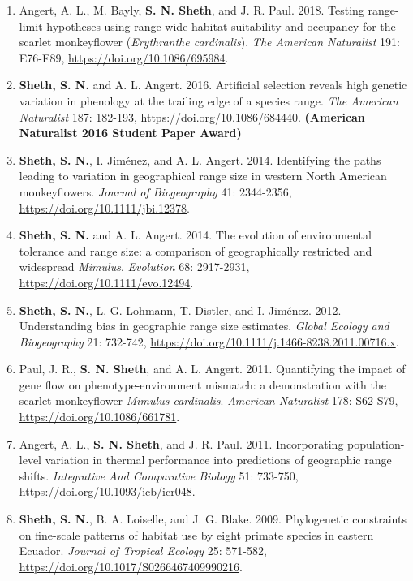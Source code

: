 \documentclass[11pt,english]{article}
\begin{document}
\begin{hangparas}{.5in}{1}
\begin{enumerate}
\item Angert, A. L., M. Bayly, \textbf{S. N. Sheth}, and J. R. Paul. 2018. Testing range-limit hypotheses using range-wide habitat suitability and occupancy for the scarlet monkeyflower (\textit{Erythranthe cardinalis}). \emph{The American Naturalist} 191: E76-E89, \url{https://doi.org/10.1086/695984}.

 \item \textbf{Sheth, S. N.} and A. L. Angert. 2016. Artificial selection reveals high genetic variation in phenology at the trailing edge of a species range. \emph{The American Naturalist} 187: 182-193, \url{https://doi.org/10.1086/684440}. \textbf{(American Naturalist 2016 Student Paper Award)} 
 
\item \textbf{Sheth, S. N.}, I. Jim\'enez, and A. L. Angert. 2014. Identifying the paths leading to variation in geographical range size in western North American monkeyflowers. \emph{Journal of Biogeography} 41: 2344-2356, \url{https://doi.org/10.1111/jbi.12378}. 

\item \textbf{Sheth, S. N.} and A. L. Angert. 2014. The evolution of environmental tolerance and range size: a comparison of geographically restricted and widespread \textit{Mimulus}. \emph{Evolution} 68: 2917-2931, \url{https://doi.org/10.1111/evo.12494}. 

\item \textbf{Sheth, S. N.}, L. G. Lohmann, T. Distler, and I. Jim\'enez. 2012. Understanding bias in geographic range size estimates. \emph{Global Ecology and Biogeography} 21: 732-742, \url{https://doi.org/10.1111/j.1466-8238.2011.00716.x}.
 
 \item Paul, J. R., \textbf{S. N. Sheth}, and A. L. Angert. 2011. Quantifying the impact of gene flow on phenotype-environment mismatch: a demonstration with the scarlet monkeyflower \textit{Mimulus cardinalis}. \emph{American Naturalist} 178: S62-S79, \url{https://doi.org/10.1086/661781}. 
 
\item Angert, A. L., \textbf{S. N. Sheth}, and J. R. Paul. 2011. Incorporating population-level variation in thermal performance into predictions of geographic range shifts. \emph{Integrative And Comparative Biology} 51: 733-750, \url{https://doi.org/10.1093/icb/icr048}. 

\item \textbf{Sheth, S. N.}, B. A. Loiselle, and J. G. Blake. 2009. Phylogenetic constraints on fine-scale patterns of habitat use by eight primate species in eastern Ecuador. \emph{Journal of Tropical Ecology} 25: 571-582, \url{https://doi.org/10.1017/S0266467409990216}. 


\end{enumerate}
\end{hangparas}
\end{document}
